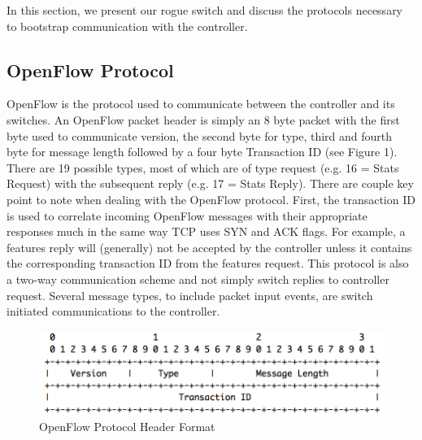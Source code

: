 In this section, we present our rogue switch and discuss the protocols necessary to bootstrap communication with the controller.

\subsection {OpenFlow Protocol}
OpenFlow is the protocol used to communicate between the controller and its switches. An OpenFlow packet header is simply an 8 byte packet with the first byte used to communicate version, the second byte for type, third and fourth byte for message length followed by a four byte Transaction ID (see Figure 1). There are 19 possible types, most of which are of type request (e.g. 16 = Stats Request) with the subsequent reply (e.g. 17 = Stats Reply). There are couple key point to note when dealing with the OpenFlow protocol. First, the transaction ID is used to correlate incoming OpenFlow messages with their appropriate responses much in the same way TCP uses SYN and ACK flags. For example, a features reply will (generally) not be accepted by the controller unless it contains the corresponding transaction ID from the features request. This protocol is also a two-way communication scheme and not simply switch replies to controller request. Several message types, to include packet input events, are switch initiated communications to the controller.  

\begin{figure}
  \includegraphics[width=\linewidth]{openflowProtocol.png}
  \caption{OpenFlow Protocol Header Format \cite{protocol}}
  \label{fig:protocol}
\end{figure}

